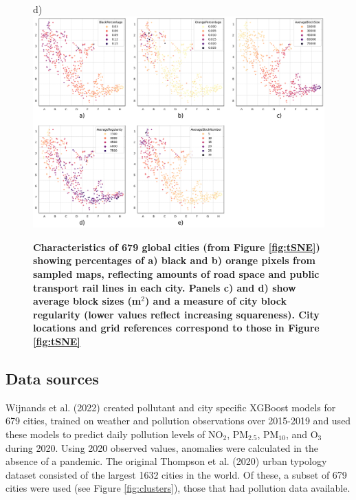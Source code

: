 \documentclass[preprint,12pt]{elsarticle}
\begin{document}
\begin{figure}
\scriptsize{d)} \includegraphics[trim={ 7 30 703 380 },clip,scale=0.40]{Images/City_Types_Dimension_chessboard.png}
\caption{\bf Characteristics of 679 global cities (from Figure \ref{fig:tSNE}) showing percentages\cite{Thompson2020} of a) black and b) orange pixels from sampled maps, reflecting amounts of road space and public transport rail lines in each city. Panels c) and d) show\cite{Nice2019b} average block sizes (m$^{2}$) and a measure of city block regularity (lower values reflect increasing squareness). City locations and grid references correspond to those in Figure \ref{fig:tSNE}}
 \label{fig:Dimensions}
\end{figure}




\subsection*{Data sources}\label{sec:datasources}


Wijnands et al. (2022)\cite{Wijnands2022} created pollutant and city specific XGBoost models for 679 cities, trained on weather and pollution observations over 2015-2019 and used these models to predict daily pollution levels of NO$_{2}$, PM$_{2.5}$, PM$_{10}$, and O$_{3}$ during 2020. Using 2020 observed values, anomalies were calculated in the absence of a pandemic. The original Thompson et al. (2020)\cite{Thompson2020} urban typology dataset consisted of the largest 1632 cities in the world. Of these, a subset of 679 cities were used (see Figure \ref{fig:clusters}), those that had pollution data available.
\end{document}
